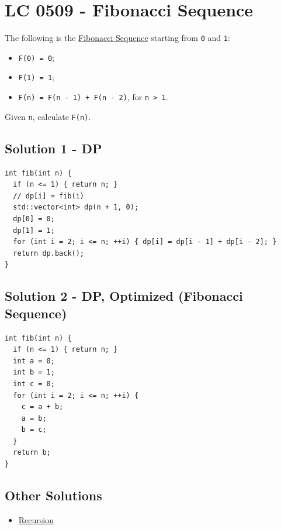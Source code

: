 \section{LC 0509 - Fibonacci Sequence}
The following is the \ul{Fibonacci Sequence} starting from {\colorbox{CodeBackground}{\lstinline|0|}} and {\colorbox{CodeBackground}{\lstinline|1|}}:
\begin{itemize}
\item {\colorbox{CodeBackground}{\lstinline|F(0) = 0|}};
\item {\colorbox{CodeBackground}{\lstinline|F(1) = 1|}};
\item {\colorbox{CodeBackground}{\lstinline|F(n) = F(n - 1) + F(n - 2)|}}, for {\colorbox{CodeBackground}{\lstinline|n > 1|}}.
\end{itemize}

Given {\colorbox{CodeBackground}{\lstinline|n|}}, calculate {\colorbox{CodeBackground}{\lstinline|F(n)|}}.

\subsection*{Solution 1 - DP}\label{solution:lc0509_dp}
\begin{lstlisting}
int fib(int n) {
  if (n <= 1) { return n; }
  // dp[i] = fib(i)
  std::vector<int> dp(n + 1, 0);
  dp[0] = 0;
  dp[1] = 1;
  for (int i = 2; i <= n; ++i) { dp[i] = dp[i - 1] + dp[i - 2]; }
  return dp.back();
}
\end{lstlisting}

\subsection*{Solution 2 - DP, Optimized (Fibonacci Sequence)}\label{solution:lc0509_fibonacci_sequence}
\begin{lstlisting}
int fib(int n) {
  if (n <= 1) { return n; }
  int a = 0;
  int b = 1;
  int c = 0;
  for (int i = 2; i <= n; ++i) {
    c = a + b;
    a = b;
    b = c;
  }
  return b;
}
\end{lstlisting}

\subsection*{Other Solutions}
\begin{itemize}
\item \hyperref[solution:lc0509_recursion]{Recursion}
\end{itemize}

